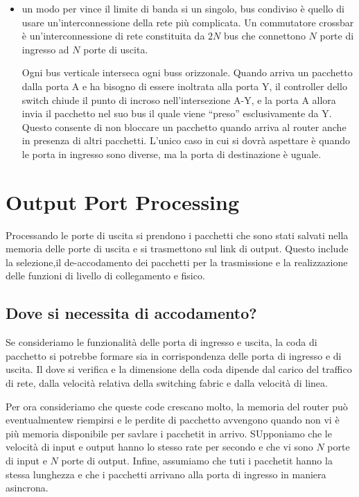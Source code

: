 \documentclass{book}
\newcommand{\tmtextit}[1]{\text{{\itshape{#1}}}}
\begin{document}
\begin{itemize}
  \item \tmtextit{Switching via an interconnettion network:} un modo per vince
  il limite di banda si un singolo, bus condiviso {\`e} quello di usare
  un'interconnessione della rete pi{\`u} complicata. Un commutatore crossbar
  {\`e} un'interconnessione di rete constituita da $2 N$ bus che connettono
  $N$ porte di ingresso ad $N$ porte di uscita.
  
  Ogni bus verticale interseca ogni buss orizzonale. Quando arriva un
  pacchetto dalla porta A e ha bisogno di essere inoltrata alla porta Y, il
  controller dello switch chiude il punto di incroso nell'intersezione A-Y, e
  la porta A allora invia il pacchetto nel suo bus il quale viene ``preso''
  esclusivamente da Y. Questo consente di non bloccare un pacchetto quando
  arriva al router anche in presenza di altri pacchetti. L'unico caso in cui
  si dovr{\`a} aspettare {\`e} quando le porta in ingresso sono diverse, ma la
  porta di destinazione {\`e} uguale.
\end{itemize}

\section{Output Port Processing}

Processando le porte di uscita si prendono i pacchetti che sono stati salvati
nella memoria delle porte di uscita e si trasmettono sul link di output.
Questo include la selezione,il de-accodamento dei pacchetti per la
trasmissione e la realizzazione delle funzioni di livello di collegamento e
fisico.

\subsection{Dove si necessita di accodamento?}

Se consideriamo le funzionalit{\`a} delle porta di ingresso e uscita, la coda
di pacchetto si potrebbe formare sia in corrispondenza delle porta di ingresso
e di uscita. Il dove si verifica e la dimensione della coda dipende dal carico
del traffico di rete, dalla velocit{\`a} relativa della switching fabric e
dalla velocit{\`a} di linea.

Per ora consideriamo che queste code crescano molto, la memoria del router
pu{\`o} eventualmentew riempirsi e le perdite di pacchetto avvengono quando
non vi {\`e} pi{\`u} memoria disponibile per savlare i pacchetit in arrivo.
SUpponiamo che le velocit{\`a} di input e output hanno lo stesso rate per
secondo e che vi sono $N$ porte di input e $N$ porte di output. Infine,
assumiamo che tuti i pacchetit hanno la stessa lunghezza e che i pacchetti
arrivano alla porta di ingresso in maniera asincrona.
\end{document}

